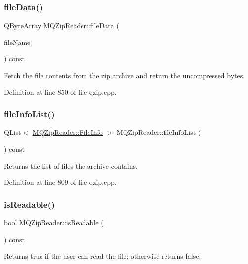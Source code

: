 \subsubsection{\texorpdfstring{file\+Data()}{fileData()}}
{\footnotesize\ttfamily Q\+Byte\+Array M\+Q\+Zip\+Reader\+::file\+Data (\begin{DoxyParamCaption}\item[{const Q\+String \&}]{file\+Name }\end{DoxyParamCaption}) const}

Fetch the file contents from the zip archive and return the uncompressed bytes. 

Definition at line 850 of file qzip.\+cpp.

\mbox{\label{class_m_q_zip_reader_a73e39077044aed4642ee02252cc08970}} 
\subsubsection{\texorpdfstring{file\+Info\+List()}{fileInfoList()}}
{\footnotesize\ttfamily Q\+List$<$ \hyperlink{struct_m_q_zip_reader_1_1_file_info}{M\+Q\+Zip\+Reader\+::\+File\+Info} $>$ M\+Q\+Zip\+Reader\+::file\+Info\+List (\begin{DoxyParamCaption}{ }\end{DoxyParamCaption}) const}

Returns the list of files the archive contains. 

Definition at line 809 of file qzip.\+cpp.

\mbox{\label{class_m_q_zip_reader_a54bd229faa64c78ec36475da770831d6}} 
\subsubsection{\texorpdfstring{is\+Readable()}{isReadable()}}
{\footnotesize\ttfamily bool M\+Q\+Zip\+Reader\+::is\+Readable (\begin{DoxyParamCaption}{ }\end{DoxyParamCaption}) const}

Returns true if the user can read the file; otherwise returns false. 

